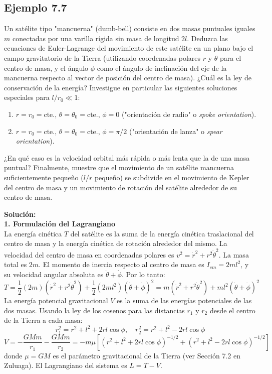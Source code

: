 \documentclass[a4paper]{article}
\begin{document}
\subsection{Ejemplo 7.7}

Un satélite tipo "mancuerna" (dumb-bell) consiste en dos masas puntuales iguales $m$ conectadas por una varilla rígida sin masa de longitud $2l$. Deduzca las ecuaciones de Euler-Lagrange del movimiento de este satélite en un plano bajo el campo gravitatorio de la Tierra (utilizando coordenadas polares $r$ y $\theta$ para el centro de masa, y el ángulo $\phi$ como el ángulo de inclinación del eje de la mancuerna respecto al vector de posición del centro de masa). ¿Cuál es la ley de conservación de la energía? Investigue en particular las siguientes soluciones especiales para $l/r_0 \ll 1$:
\begin{enumerate}
    \item[(a)] $r=r_0=\text{cte.}$, $\theta=\theta_0=\text{cte.}$, $\phi=0$ ("orientación de radio" o \textit{spoke orientation}).
    \item[(b)] $r=r_0=\text{cte.}$, $\theta=\theta_0=\text{cte.}$, $\phi=\pi/2$ ("orientación de lanza" o \textit{spear orientation}).
\end{enumerate}
¿En qué caso es la velocidad orbital más rápida o más lenta que la de una masa puntual? Finalmente, muestre que el movimiento de un satélite mancuerna suficientemente pequeño ($l/r$ pequeño) se subdivide en el movimiento de Kepler del centro de masa y un movimiento de rotación del satélite alrededor de su centro de masa.

\textbf{Solución:} \\

\textbf{1. Formulación del Lagrangiano} \\
La energía cinética $T$ del satélite es la suma de la energía cinética traslacional del centro de masa y la energía cinética de rotación alrededor del mismo. La velocidad del centro de masa en coordenadas polares es $v^2 = \dot{r}^2 + r^2\dot{\theta}^2$. La masa total es $2m$. El momento de inercia respecto al centro de masa es $I_{cm} = 2ml^2$, y su velocidad angular absoluta es $\dot{\theta} + \dot{\phi}$. Por lo tanto:
$$
T = \frac{1}{2}(2m)(\dot{r}^2 + r^2\dot{\theta}^2) + \frac{1}{2}(2ml^2)(\dot{\theta} + \dot{\phi})^2 = m(\dot{r}^2 + r^2\dot{\theta}^2) + ml^2(\dot{\theta} + \dot{\phi})^2
$$
La energía potencial gravitacional $V$ es la suma de las energías potenciales de las dos masas. Usando la ley de los cosenos para las distancias $r_1$ y $r_2$ desde el centro de la Tierra a cada masa:
$$
r_1^2 = r^2 + l^2 + 2rl\cos\phi, \quad r_2^2 = r^2 + l^2 - 2rl\cos\phi
$$
$$
V = -\frac{G M m}{r_1} - \frac{G M m}{r_2} = -m\mu \left[ (r^2+l^2+2rl\cos\phi)^{-1/2} + (r^2+l^2-2rl\cos\phi)^{-1/2} \right]
$$
donde $\mu = GM$ es el parámetro gravitacional de la Tierra (ver Sección 7.2 en Zuluaga). El Lagrangiano del sistema es $L = T - V$.
\end{document}
